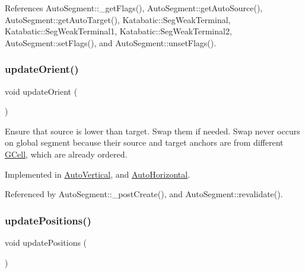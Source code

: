 References Auto\+Segment\+::\+\_\+get\+Flags(), Auto\+Segment\+::get\+Auto\+Source(), Auto\+Segment\+::get\+Auto\+Target(), Katabatic\+::\+Seg\+Weak\+Terminal, Katabatic\+::\+Seg\+Weak\+Terminal1, Katabatic\+::\+Seg\+Weak\+Terminal2, Auto\+Segment\+::set\+Flags(), and Auto\+Segment\+::unset\+Flags().

\mbox{\label{classKatabatic_1_1AutoSegment_a102e0f4bbb0386e41be214d15a9e4549}} 
\subsubsection{\texorpdfstring{update\+Orient()}{updateOrient()}}
{\footnotesize\ttfamily void update\+Orient (\begin{DoxyParamCaption}{ }\end{DoxyParamCaption})\hspace{0.3cm}{\ttfamily [pure virtual]}}

Ensure that source is lower than target. Swap them if needed. Swap never occurs on global segment because their source and target anchors are from different \mbox{\hyperlink{classKatabatic_1_1GCell}{G\+Cell}}, which are already ordered. 

Implemented in \mbox{\hyperlink{classKatabatic_1_1AutoVertical_a59058f4593049c583c5b3698ff81b299}{Auto\+Vertical}}, and \mbox{\hyperlink{classKatabatic_1_1AutoHorizontal_a59058f4593049c583c5b3698ff81b299}{Auto\+Horizontal}}.



Referenced by Auto\+Segment\+::\+\_\+post\+Create(), and Auto\+Segment\+::revalidate().

\mbox{\label{classKatabatic_1_1AutoSegment_a6d95f4de39c13611786c95ddc7b8942e}} 
\subsubsection{\texorpdfstring{update\+Positions()}{updatePositions()}}
{\footnotesize\ttfamily void update\+Positions (\begin{DoxyParamCaption}{ }\end{DoxyParamCaption})\hspace{0.3cm}{\ttfamily [pure virtual]}}

